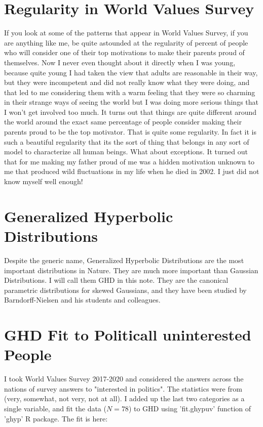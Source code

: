 \documentclass{amsart}
\begin{document}
\section{Regularity in World Values Survey}

If you look at some of the patterns that appear in World Values Survey, if you are anything like me, be quite astounded at the regularity of percent of people who will consider one of their top motivations to make their parents proud of themselves.  Now I never even thought about it directly when I was young, because quite young I had taken the view that adults are reasonable in their way, but they were incompetent and did not really know what they were doing, and that led to me considering them with a warm feeling that they were so charming in their strange ways of seeing the world but I was doing more serious things that I won't get involved too much.  It turns out that things are quite different around the world around the exact same percentage of people consider making their parents proud to be the top motivator.  That is quite some regularity.  In fact it is such a beautiful regularity that its the sort of thing that belongs in any sort of model to characterize all human beings.  What about exceptions.  It turned out that for me making my father proud of me was a hidden motivation unknown to me that produced wild fluctuations in my life when he died in 2002.  I just did not know myself well enough!

\section{Generalized Hyperbolic Distributions}

Despite the generic name, Generalized Hyperbolic Distributions are the most important distributions in Nature.  They are much more important than Gaussian Distributions.  I will call them GHD in this note.  They are the canonical parametric distributions for skewed Gaussians, and they have been studied by Barndorff-Nielsen and his students and colleagues.  


\section{GHD Fit to Politicall uninterested People}
I took World Values Survey 2017-2020 and considered the answers across the nations of survey answers to "interested in politics". The statistics were from (very, somewhat, not very, not at all).  I added up the last two categories as a single variable, and fit the data ($N=78$) to GHD using 'fit.ghypuv' function of 'ghyp' R package. The fit is here:
\end{document}
